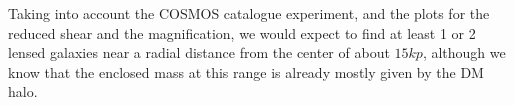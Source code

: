 Taking into account the COSMOS catalogue experiment, and the plots for the reduced shear and the magnification, we would expect to find at least 1 or 2 lensed galaxies near a radial distance from the center of about $15 kp$, although we know that the enclosed mass at this range is already mostly given by the DM halo. 

